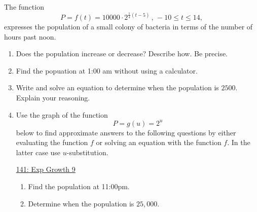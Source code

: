 \documentclass{ximera}
\begin{document}
\begin{question} \label{Q435tt5444}
The function
\[
     P = f(t) = 10000 \cdot 2^{\frac{1}{4}(t-5)} \, , \, -10\leq t \leq 14,
\]
expresses the population of a small colony of bacteria in terms of the number of hours past noon.
\begin{enumerate}
\item Does the population increase or decrease? Describe how. Be precise.

\item Find the popuation at 1:00 am without using a calculator.

\item Write and solve an equation to determine when the population is $2500$. Explain your reasoning.

\item Use the graph of the function 
\[
     P = g(u) = 2^u
\]
below to find approximate answers to the following questions by either evaluating the function $f$ or solving an equation with the function $f$. In the latter case use $u$-substitution.

\begin{onlineOnly}
    \begin{center}
\end{center}
\end{onlineOnly}

\href{https://www.desmos.com/calculator/fslkdtjqjl}{141: Exp Growth 9}

\begin{enumerate}
\item Find the population at 11:00pm.

\item Determine when the population is $25,000$.
\end{enumerate}
\end{enumerate}
\end{question}
\end{document}

